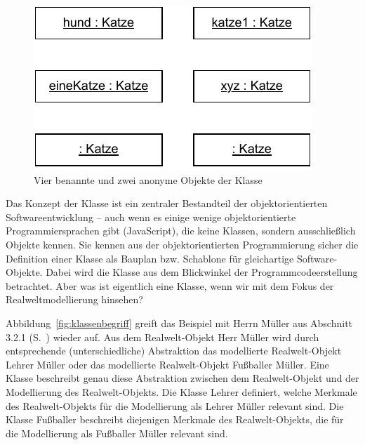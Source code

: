 \begin{figure}[h!]
	\centering
	\includegraphics{Bilder/Kapitel-4/sechs_mal_katze.pdf}
	\caption{Vier benannte und zwei anonyme Objekte der Klasse }
	\label{fig:sechs_mal_katze}
\end{figure}

Das Konzept der Klasse ist ein zentraler Bestandteil der objektorientierten Softwareentwicklung – auch wenn es einige wenige objektorientierte Programmiersprachen gibt (\zb JavaScript), die keine Klassen, sondern ausschließlich Objekte kennen. Sie kennen aus der objektorientierten Programmierung sicher die Definition einer Klasse als Bauplan bzw. Schablone für gleichartige Software-Objekte. Dabei wird die Klasse aus dem Blickwinkel der Programmcodeerstellung betrachtet. Aber was ist eigentlich eine Klasse, wenn wir mit dem Fokus der Realweltmodellierung hinsehen?

Abbildung~\ref{fig:klassenbegriff} greift das Beispiel mit Herrn Müller aus Abschnitt 3.2.1 (S.~\pageref{fig:mueller_lehrer_fussballer}) wieder auf. Aus dem Realwelt-Objekt Herr Müller wird durch entsprechende (unter\-schied\-liche) Abstraktion das modellierte Realwelt-Objekt Lehrer Müller oder das modellierte Realwelt-Objekt Fußballer Müller. Eine Klasse
beschreibt genau diese Abstraktion zwischen dem Realwelt-Objekt und der Modellierung des Realwelt-Objekts. Die Klasse Lehrer definiert, welche Merkmale des Realwelt-Objekts für die Modellierung als Lehrer Müller relevant sind. Die Klasse Fußballer beschreibt die\-jenigen Merkmale des Realwelt-Objekts, die für die Modellierung als Fußballer Müller relevant sind.

